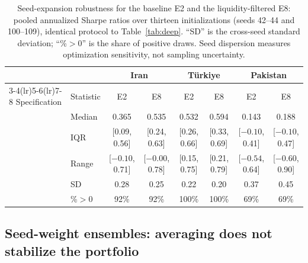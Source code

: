 \documentclass[12pt]{article}
\begin{document}
\begin{table}[htbp]
\centering
\caption{Seed-expansion robustness for the baseline E2 and the liquidity-filtered E8: pooled annualized Sharpe ratios over thirteen initializations (seeds 42--44 and 100--109), identical protocol to Table~\ref{tab:deep}. ``SD'' is the cross-seed standard deviation; ``\%$>$0'' is the share of positive draws. Seed dispersion measures optimization sensitivity, not sampling uncertainty.}
\label{tab:seedexp}
\footnotesize
\setlength{\tabcolsep}{4pt}
\begin{tabular}{ll cccccc}
\toprule
 & & \multicolumn{2}{c}{Iran} & \multicolumn{2}{c}{T\"urkiye} & \multicolumn{2}{c}{Pakistan} \\
\cmidrule(lr){3-4}\cmidrule(lr){5-6}\cmidrule(lr){7-8}
Specification & Statistic & E2 & E8 & E2 & E8 & E2 & E8 \\
\midrule
 & Median & 0.365 & 0.535 & 0.532 & 0.594 & 0.143 & 0.188 \\
 & IQR & [0.09, 0.56] & [0.24, 0.63] & [0.26, 0.66] & [0.33, 0.69] & [$-0.10$, 0.41] & [$-0.10$, 0.47] \\
 & Range & [$-0.10$, 0.71] & [$-0.00$, 0.78] & [0.15, 0.75] & [0.21, 0.79] & [$-0.54$, 0.64] & [$-0.60$, 0.90] \\
 & SD & 0.28 & 0.25 & 0.22 & 0.20 & 0.37 & 0.45 \\
 & \%$>$0 & 92\% & 92\% & 100\% & 100\% & 69\% & 69\% \\
\bottomrule
\end{tabular}
\end{table}

\subsection{Seed-weight ensembles: averaging does not stabilize the portfolio}\label{sec:ensemble}
\end{document}
